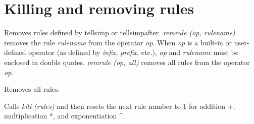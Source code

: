 \documentclass[../Maxima_Workbook.tex]{subfiles}
\begin{document}
\section{Killing and removing rules}

 \hfill \tcr{[function]}

\lz Removes rules defined by tellsimp or tellsimpafter. \emph{remrule (op, rulename)} removes the rule \emph{rulename} from the operator \emph{op}. When \emph{op} is a built-in or user-defined operator (as defined by \emph{infix}, \emph{prefix}, etc.), \emph{op} and \emph{rulename} must be enclosed in double quotes. \emph{remrule (op, all)} removes all rules from the operator \emph{op}.

\lzz {} \hfill \tcr{[function]}

\lz Removes all rules.

\lzz {} \hfill \tcr{[function]}

\lz Calls \emph{kill (rules)} and then resets the next rule number to 1 for addition +, multiplication *, and exponentiation \textasciicircum.
\end{document}
